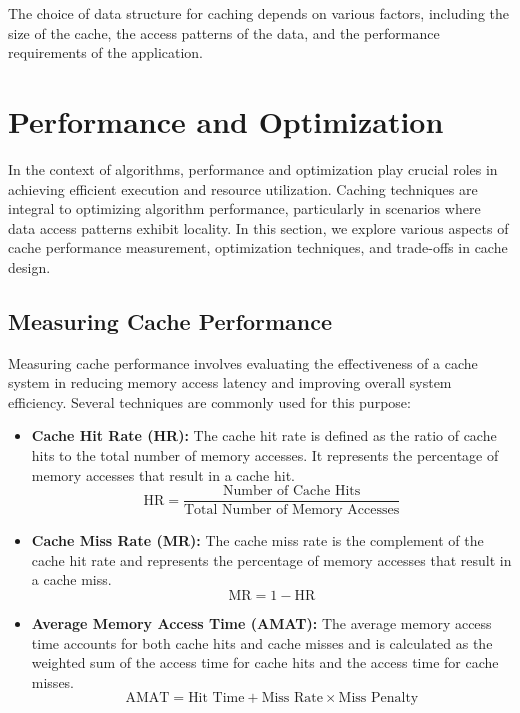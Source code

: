 \documentclass[12pt]{book} %
\begin{document}
The choice of data structure for caching depends on various factors, including the size of the cache, the access patterns of the data, and the performance requirements of the application.

\section{Performance and Optimization}

In the context of algorithms, performance and optimization play crucial roles in achieving efficient execution and resource utilization. Caching techniques are integral to optimizing algorithm performance, particularly in scenarios where data access patterns exhibit locality. In this section, we explore various aspects of cache performance measurement, optimization techniques, and trade-offs in cache design.

\subsection{Measuring Cache Performance}

Measuring cache performance involves evaluating the effectiveness of a cache system in reducing memory access latency and improving overall system efficiency. Several techniques are commonly used for this purpose:

\begin{itemize}
    \item \textbf{Cache Hit Rate (HR):} The cache hit rate is defined as the ratio of cache hits to the total number of memory accesses. It represents the percentage of memory accesses that result in a cache hit.
    \begin{equation*}
        \text{HR} = \frac{\text{Number of Cache Hits}}{\text{Total Number of Memory Accesses}}
    \end{equation*}
    
    \item \textbf{Cache Miss Rate (MR):} The cache miss rate is the complement of the cache hit rate and represents the percentage of memory accesses that result in a cache miss.
    \begin{equation*}
        \text{MR} = 1 - \text{HR}
    \end{equation*}
    
    \item \textbf{Average Memory Access Time (AMAT):} The average memory access time accounts for both cache hits and cache misses and is calculated as the weighted sum of the access time for cache hits and the access time for cache misses.
    \begin{equation*}
        \text{AMAT} = \text{Hit Time} + \text{Miss Rate} \times \text{Miss Penalty}
    \end{equation*}
\end{itemize}
\end{document}
